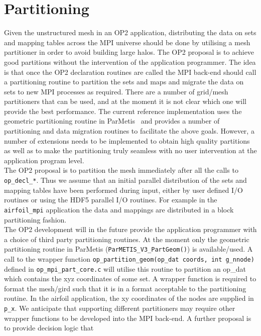 \documentclass[12pt]{article}
\begin{document}
\section{Partitioning}\label{sec/partitioning}
Given the unstructured mesh in an OP2 application, distributing the data on sets and mapping tables across the MPI
universe should be done by utilising a mesh partitioner in order to avoid building large halos. The OP2 proposal is to
achieve good partitions without the intervention of the application programmer. The idea is that once the OP2
declaration routines are called the MPI back-end should call a partitioning routine to partition the sets and maps and
migrate the data on sets to new MPI processes as required. There are a number of grid/mesh partitioners that can be
used, and at the moment it is not clear which one will provide the best performance. The current reference
implementation uses the geometric partitioning routine in ParMetis~\cite{ParMETIS} and provides a number of partitioning
and data migration routines to facilitate the above goals. However, a number of extensions needs to be implemented to
obtain high quality partitions as well as to make the partitioning truly seamless with no user intervention at the
application program level.\\
\indent The OP2 proposal is to partition the mesh immediately after all the calls to \texttt{op\_decl\_*}. Thus we
assume that an initial parallel distribution of the sets and mapping tables have been performed during input, either by
user defined I/O routines or using the HDF5 parallel I/O routines. For example in the \texttt{airfoil\_mpi} application
the data and mappings are distributed in a block partitioning fashion. \\
\indent The OP2 development will in the future provide the application programmer with a choice of third party
partitioning routines. At the moment only the geometric partitioning routine in ParMetis
(\texttt{ParMETIS\_V3\_PartGeom()}) is available/used. A call to the wrapper function
\texttt{op\_partition\_geom(op\_dat coords, int g\_nnode)} defined in \texttt{op\_mpi\_part\_core.c} will utilise this
routine to partition an op\_dat which contains the xyz coordinates of some set. A wrapper function is required to format
the mesh/gird such that it is in a format acceptable to the partitioning routine. In the airfoil application, the xy
coordinates of the nodes are supplied in \texttt{p\_x}. We anticipate that supporting different partitioners may require
other wrapper functions to be developed into the MPI back-end. A further proposal is to provide decision logic that
\end{document}
